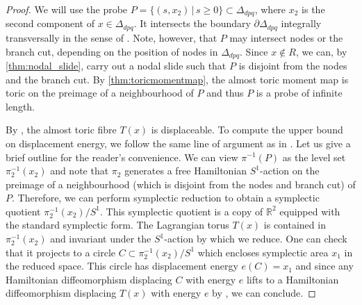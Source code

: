 \documentclass[12pt,a4paper,draft]{scrartcl}
\begin{document}
\begin{proof}
We will use the probe $P = \{(s,x_2) \, \vert \, s ≥ 0\} \subset \Delta_{dpq}$, where $x_2$ is the second component of $x \in \Delta_{dpq}$. It intersects the boundary $∂ \Delta_{dpq}$ integrally transversally in the sense of \cite[Section 2.1]{mcduff2011displacing}. Note, however, that $P$ may intersect nodes or the branch cut, depending on the position of nodes in $\Delta_{dpq}$. Since $x ∉ R$, we can, by \cref{thm:nodal_slide}, carry out a nodal slide such that $P$ is disjoint from the nodes and the branch cut.
By \cref{thm:toricmomentmap}, the almost toric moment map is toric on the preimage of a neighbourhood of $P$ and thus $P$ is a probe of infinite length.

By \cite[Lemma 2.4]{mcduff2011displacing}, the almost toric fibre $T(x)$ is displaceable.
To compute the upper bound on displacement energy, we follow the same line of argument as in \cite[Proposition 3.4]{brendel2020real}. Let us give a brief outline for the reader's convenience.
We can view $\pi^{-1}(P)$ as the level set $\pi_2^{-1}(x_2)$ and note that $\pi_2$ generates a free Hamiltonian $S^1$-action on the preimage of a neighbourhood (which is disjoint from the nodes and branch cut) of $P$. Therefore, we can perform symplectic reduction to obtain a symplectic quotient $\pi_2^{-1}(x_2)/S^1$. This symplectic quotient is a copy of $\mathbb{R}^2$ equipped with the standard symplectic form.
The Lagrangian torus $T(x)$ is contained in $\pi_2^{-1}(x_2)$ and invariant under the $S^1$-action by which we reduce.
One can check that it projects to a circle $C \subset \pi_2^{-1}(x_2)/S^1$ which encloses symplectic area $x_1$ in the reduced space.
This circle has displacement energy $e(C) = x_1$ and since any Hamiltonian diffeomorphism displacing $C$ with energy $e$ lifts to a Hamiltonian diffeomorphism displacing $T(x)$ with energy $e$ by \cite[Lemma 3.1]{brendel2020real}, we can conclude.
\end{proof}
\end{document}
